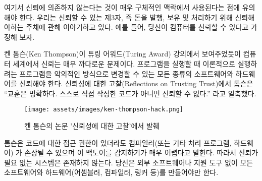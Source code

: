 \begin{comment}
	Note that \textit{without relying on trust} is used in a very specific context
	here. We are talking about trusted third parties, i.e. other entities
	which you trust to produce, hold, and process your money. It is assumed,
	for example, that you can trust your computer.
\end{comment}
여기서 신뢰에 의존하지 않는다는 것이 매우 구체적인 맥락에서 사용된다는 점에 유의해야 한다.
우리는 신뢰할 수 있는 제3자, 즉 돈을 발행, 보유 및 처리하기 위해 신뢰해야하는 주체에 관해 이야기하고 있다.
예를 들어, 당신이 컴퓨터를 신뢰할 수 있다고 가정해 보자.

\begin{comment}
	As Ken Thompson showed in his Turing Award lecture, trust is an
	extremely tricky thing in the computational world. When running a
	program, you have to trust all kinds of software (and hardware) which,
	in theory, could alter the program you are trying to run in a malicious
	way. As Thompson summarized in his \textit{Reflections on Trusting Trust}:
	\enquote{The moral is obvious. You can't trust code that you did not totally
		create yourself.}~\cite{trusting-trust}
\end{comment}
켄 톰슨(Ken Thompson)이 튜링 어워드(Turing Award) 강의에서 보여주었듯이 컴퓨터 세계에서 신뢰는 매우 까다로운 문제이다.
프로그램을 실행할 때 이론적으로 실행하려는 프로그램을 악의적인 방식으로 변경할 수 있는 모든 종류의 소프트웨어와 하드웨어를 신뢰해야 한다.
신뢰성에 대한 고찰(Reflections on Trusting Trust)에서 톰슨은
\enquote{교훈은 명확하다. 스스로 직접 작성한 코드가 아니면 신뢰할 수 없다.}\cite{trusting-trust}
라고 일축했다.

\begin{figure}
	\texttt{[image: assets/images/ken-thompson-hack.png]}
	\caption{켄 톰슨의 논문 '신뢰성에 대한 고찰'에서 발췌}
	\label{fig:ken-thompson-hack}
\end{figure}

\begin{comment}
	Thompson demonstrated that even if you have access to the source code,
	your compiler --- or any other program-handling program or
	hardware --- could be compromised and detecting this backdoor would be
	very difficult. Thus, in practice, a truly \textit{trustless} system does not
	exist. You would have to create all your software \textit{and} all your
	hardware (assemblers, compilers, linkers, etc.) from scratch, without
	the aid of any external software or software-aided machinery.
\end{comment}
톰슨은 코드에 대한 접근 권한이 있더라도 컴파일러(또는 기타 처리 프로그램, 하드웨어)
가 손상될 수 있으며 이 백도어를 감지하기가 매우 어렵다고 말한다. 
따라서 신뢰가 필요 없는 시스템은 존재하지 않는다.
당신은 외부 소프트웨어나 지원 도구 없이 모든 소프트웨어와 하드웨어(어셈블러, 컴파일러, 링커 등)를 만들어야만 한다.

